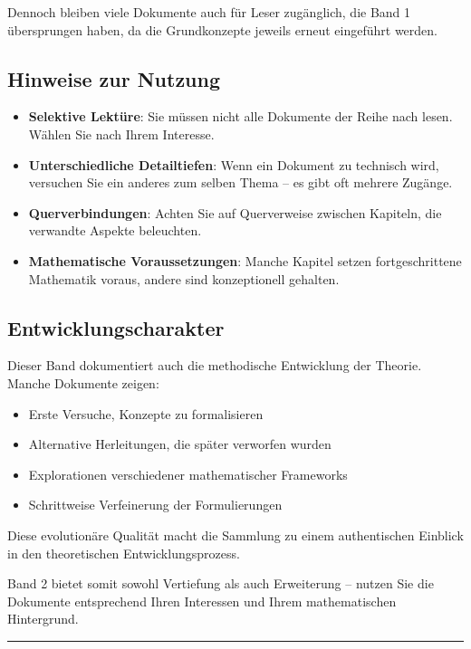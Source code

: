 Dennoch bleiben viele Dokumente auch für Leser zugänglich, die Band 1 übersprungen haben, da die Grundkonzepte jeweils erneut eingeführt werden.

\subsection*{Hinweise zur Nutzung}

\begin{itemize}
\item \textbf{Selektive Lektüre}: Sie müssen nicht alle Dokumente der Reihe nach lesen. Wählen Sie nach Ihrem Interesse.

\item \textbf{Unterschiedliche Detailtiefen}: Wenn ein Dokument zu technisch wird, versuchen Sie ein anderes zum selben Thema -- es gibt oft mehrere Zugänge.

\item \textbf{Querverbindungen}: Achten Sie auf Querverweise zwischen Kapiteln, die verwandte Aspekte beleuchten.

\item \textbf{Mathematische Voraussetzungen}: Manche Kapitel setzen fortgeschrittene Mathematik voraus, andere sind konzeptionell gehalten.
\end{itemize}

\subsection*{Entwicklungscharakter}

Dieser Band dokumentiert auch die methodische Entwicklung der Theorie. Manche Dokumente zeigen:

\begin{itemize}
\item Erste Versuche, Konzepte zu formalisieren
\item Alternative Herleitungen, die später verworfen wurden
\item Explorationen verschiedener mathematischer Frameworks
\item Schrittweise Verfeinerung der Formulierungen
\end{itemize}

Diese evolutionäre Qualität macht die Sammlung zu einem authentischen Einblick in den theoretischen Entwicklungsprozess.

\vspace{1em}
\noindent
Band 2 bietet somit sowohl Vertiefung als auch Erweiterung -- nutzen Sie die Dokumente entsprechend Ihren Interessen und Ihrem mathematischen Hintergrund.

\vfill

\begin{center}
\rule{0.5\textwidth}{0.4pt}
\end{center}
